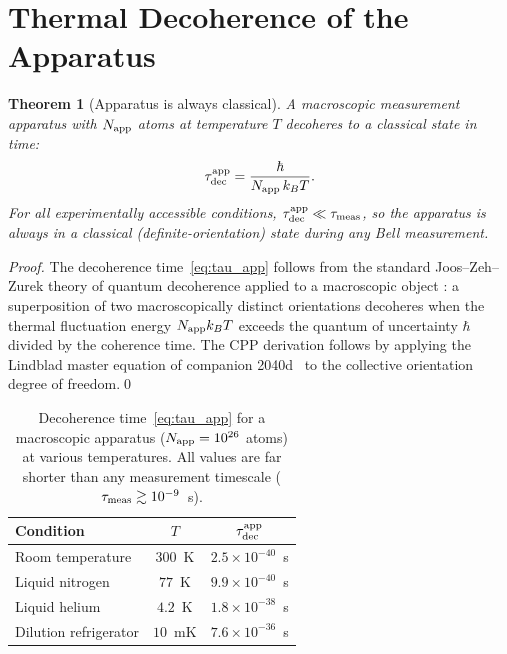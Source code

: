 \documentclass[11pt,a4paper]{article}
\newtheorem{theorem}{Theorem}[section]
\begin{document}
\section{Thermal Decoherence of the Apparatus}
\label{sec:decoherence_app}

\begin{theorem}[Apparatus is always classical]
\label{thm:classical}
A macroscopic measurement apparatus with $N_{\rm app}$ atoms at
temperature $T$ decoheres to a classical state in time:
\begin{equation}
\tau_{\rm dec}^{\rm app} = \frac{\hbar}{N_{\rm app}\,k_B T}.
\label{eq:tau_app}
\end{equation}
For all experimentally accessible conditions,
$\tau_{\rm dec}^{\rm app} \ll \tau_{\rm meas}$, so the apparatus
is always in a classical (definite-orientation) state during any
Bell measurement.
\end{theorem}

\begin{proof}
The decoherence time~\eqref{eq:tau_app} follows from the standard
Joos--Zeh--Zurek theory of quantum decoherence applied to a
macroscopic object \citep{joos1985,zurek1991}: a superposition of
two macroscopically distinct orientations decoheres when the
thermal fluctuation energy $N_{\rm app} k_B T$ exceeds the quantum
of uncertainty $\hbar$ divided by the coherence time.  The CPP
derivation follows by applying the Lindblad master equation of
companion 2040d~\citep{cpp2040d} to the collective orientation
degree of freedom.\qed
\end{proof}

\begin{table}[H]
\centering
\caption{Decoherence time~\eqref{eq:tau_app} for a macroscopic
  apparatus ($N_{\rm app} = 10^{26}$ atoms) at various temperatures.
  All values are far shorter than any measurement timescale
  ($\tau_{\rm meas} \gtrsim 10^{-9}$~s).}
\label{tab:tau_app}
\begin{tabular}{@{}lcc@{}}
\toprule
Condition & $T$ & $\tau_{\rm dec}^{\rm app}$ \\
\midrule
Room temperature & $300$~K & $2.5\times10^{-40}$~s \\
Liquid nitrogen & $77$~K & $9.9\times10^{-40}$~s \\
Liquid helium & $4.2$~K & $1.8\times10^{-38}$~s \\
Dilution refrigerator & $10$~mK & $7.6\times10^{-36}$~s \\
\bottomrule
\end{tabular}
\end{table}
\end{document}
